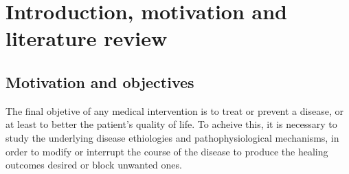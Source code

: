 \section{Introduction, motivation and literature review}






\subsection{Motivation and objectives}
The final objetive of any medical intervention is to treat or prevent a disease, or at least to better the patient's quality of life. To acheive this, it is necessary to study the underlying disease ethiologies and pathophysiological mechanisms, in order to modify or interrupt the course of the disease to produce the healing outcomes desired or block unwanted ones.

